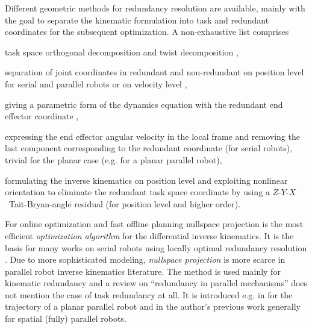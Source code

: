 \documentclass[runningheads]{llncs}
\begin{document}
Different geometric methods for redundancy resolution are available, mainly with the goal to separate the kinematic formulation into task and redundant coordinates for the subsequent optimization.
A non-exhaustive list comprises
\begin{compactitem}
\item task space orthogonal decomposition \cite{LegerAng2016,CorinaldiAngCal2016} and twist decomposition \cite{HuoBar2008},
\item separation of joint coordinates in redundant and non-redundant on position level for serial \cite{Ozgoren2013} and parallel \cite{MerletPerDan2000} robots or on velocity level \cite{ReiterMueGat2018},
\item giving a parametric form of the dynamics equation with the redundant end effector coordinate \cite{OenWan2007},
\item expressing the end effector angular velocity in the local frame and removing the last component corresponding to the redundant coordinate \cite{Zlajpah2017,ReiterMueGat2018} (for serial robots), trivial for the planar case \cite{AgarwalNasBan2016} (e.g. for a planar parallel robot),
\item formulating the inverse kinematics on position level and exploiting nonlinear orientation to eliminate the redundant task space coordinate by using a \mbox{$Z$-$Y$-$X$~Tait}-Bryan-angle residual \cite{SchapplerOrt2021} (for position level and higher order).
\end{compactitem}

For online optimization and fast offline planning nullspace projection is the most efficient \emph{optimization algorithm} for the differential inverse kinematics.
It is the basis for many works on serial robots using locally optimal redundancy resolution \cite{NakamuraHanYos1987,DeLucaOriSic1992,HuoBar2008,Zlajpah2017,ReiterMueGat2018,LilloChiAnt2019}.
Due to more sophisticated modeling, \emph{nullspace projection} is more scarce in parallel robot inverse kinematics literature.
The method is used mainly for kinematic redundancy \cite{SantosSil2017} and a review on ``redundancy in parallel mechanisms'' \cite{GosselinSch2018} does not mention the case of task redundancy at all.
It is introduced e.g. in \cite{AgarwalNasBan2016} for the trajectory of a planar parallel robot and in the author's previous work \cite{SchapplerOrt2021} generally for spatial (fully) parallel robots.
\end{document}
